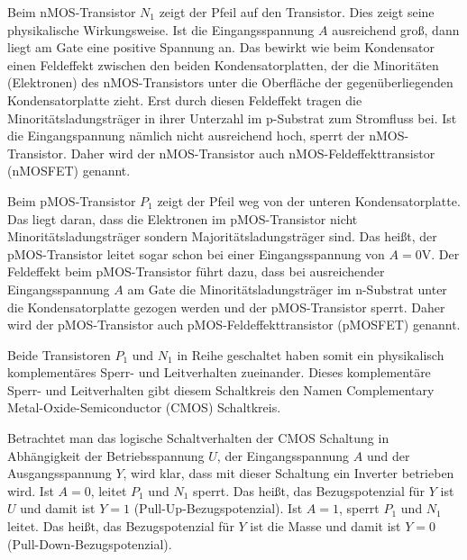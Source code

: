 \documentclass[oneside]{scrarticle}
\numberwithin{equation}{section}
\begin{document}
Beim nMOS-Transistor $N_1$ zeigt der Pfeil auf den Transistor. Dies zeigt seine physikalische Wirkungsweise. Ist die Eingangsspannung $A$ ausreichend groß, dann liegt am Gate eine positive Spannung an. Das bewirkt wie beim Kondensator einen Feldeffekt zwischen den beiden Kondensatorplatten, der die Minoritäten (Elektronen) des nMOS-Transistors unter die Oberfläche der gegenüberliegenden Kondensatorplatte zieht. Erst durch diesen Feldeffekt tragen die Minoritätsladungsträger in ihrer Unterzahl im p-Substrat zum Stromfluss bei. Ist die Eingangspannung nämlich nicht ausreichend hoch, sperrt der nMOS-Transistor. Daher wird der nMOS-Transistor auch nMOS-Feldeffekttransistor (nMOSFET) genannt.

Beim pMOS-Transistor $P_1$ zeigt der Pfeil weg von der unteren Kondensatorplatte. Das liegt daran, dass die Elektronen im pMOS-Transistor nicht Minoritätsladungsträger sondern Majoritätsladungsträger sind. Das heißt, der pMOS-Transistor leitet sogar schon bei einer Eingangsspannung von $A = 0\mathrm{V}$. Der Feldeffekt beim pMOS-Transistor führt dazu, dass bei ausreichender Eingangsspannung $A$ am Gate die Minoritätsladungsträger im n-Substrat unter die Kondensatorplatte gezogen werden und der pMOS-Transistor sperrt. Daher wird der pMOS-Transistor auch pMOS-Feldeffekttransistor (pMOSFET) genannt.

Beide Transistoren $P_1$ und $N_1$ in Reihe geschaltet haben somit ein physikalisch komplementäres Sperr- und Leitverhalten zueinander. Dieses komplementäre Sperr- und Leitverhalten gibt diesem Schaltkreis den Namen Complementary Metal-Oxide-Semiconductor (CMOS) Schaltkreis.

Betrachtet man das logische Schaltverhalten der CMOS Schaltung in Abhängigkeit der Betriebsspannung $U$, der Eingangsspannung $A$ und der Ausgangsspannung $Y$, wird klar, dass mit dieser Schaltung ein Inverter betrieben wird. Ist $A = 0$, leitet $P_1$ und $N_1$ sperrt. Das heißt, das Bezugspotenzial für $Y$ ist $U$ und damit ist $Y = 1$ (Pull-Up-Bezugspotenzial). Ist $A = 1$, sperrt $P_1$ und $N_1$ leitet. Das heißt, das Bezugspotenzial für $Y$ ist die Masse und damit ist $Y = 0$ (Pull-Down-Bezugspotenzial).
\end{document}
